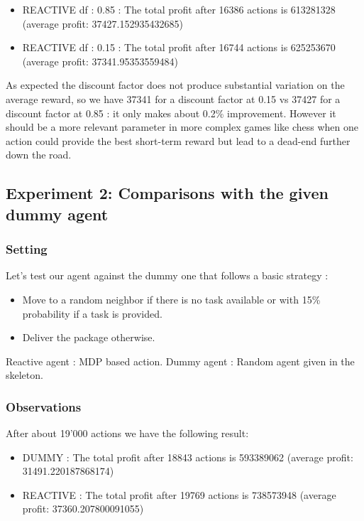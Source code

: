 \documentclass[11pt]{article}
\begin{document}
\begin{itemize}
\item REACTIVE df : 0.85 : The total profit after 16386 actions is 613281328
(average profit: 37427.152935432685)
\item REACTIVE df : 0.15 : The total profit after 16744 actions is 625253670
(average profit: 37341.95353559484)
\end{itemize}
As expected the discount factor does not produce substantial variation on the
average reward, so we have 37341 for a discount factor at 0.15 vs 37427 for a
discount factor at 0.85 : it only makes about 0.2\% improvement. However it
should be a more relevant parameter in more complex games like chess when one
action could provide the best short-term reward but lead to a dead-end further
down the road.

\subsection{Experiment 2: Comparisons with the given dummy agent}

\subsubsection{Setting}

Let's test our agent against the dummy one that follows a basic strategy :

\begin{itemize}
\item Move to a random neighbor if there is no task available or with 15\%
probability if a task is provided.
\item Deliver the package otherwise.
\end{itemize}

Reactive agent : MDP based action.
Dummy agent : Random agent given in the skeleton.

\subsubsection{Observations}
After about 19'000 actions we have the following result:
\begin{itemize}
\item DUMMY : The total profit after 18843 actions is 593389062 (average profit:
31491.220187868174)
\item REACTIVE : The total profit after 19769 actions is 738573948 (average
profit: 37360.207800091055)
\end{itemize}
\end{document}
